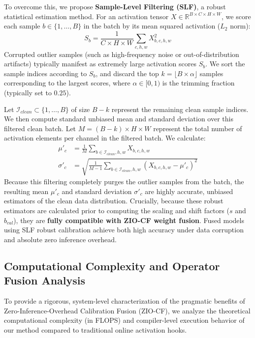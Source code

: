 \documentclass{article}
\begin{document}
To overcome this, we propose \textbf{Sample-Level Filtering (SLF)}, a robust statistical estimation method. For an activation tensor $X \in \mathbb{R}^{B \times C \times H \times W}$, we score each sample $b \in \{1, \dots, B\}$ in the batch by its mean squared activation ($L_2$ norm):
\begin{equation}
    S_b = \frac{1}{C \times H \times W} \sum_{c, h, w} X_{b, c, h, w}^2
\end{equation}
Corrupted outlier samples (such as high-frequency noise or out-of-distribution artifacts) typically manifest as extremely large activation scores $S_b$. We sort the sample indices according to $S_b$, and discard the top $k = \lfloor B \times \alpha \rfloor$ samples corresponding to the largest scores, where $\alpha \in [0, 1)$ is the trimming fraction (typically set to $0.25$). 

Let $\mathcal{I}_{clean} \subset \{1, \dots, B\}$ of size $B - k$ represent the remaining clean sample indices. We then compute standard unbiased mean and standard deviation over this filtered clean batch. Let $M = (B-k) \times H \times W$ represent the total number of activation elements per channel in the filtered batch. We calculate:
\begin{align}
    \mu'_c &= \frac{1}{M} \sum_{b \in \mathcal{I}_{clean}, h, w} X_{b, c, h, w} \\
    \sigma'_c &= \sqrt{\frac{1}{M - 1} \sum_{b \in \mathcal{I}_{clean}, h, w} \left(X_{b, c, h, w} - \mu'_c\right)^2}
\end{align}
Because this filtering completely purges the outlier samples from the batch, the resulting mean $\mu'_c$ and standard deviation $\sigma'_c$ are highly accurate, unbiased estimators of the clean data distribution. Crucially, because these robust estimators are calculated prior to computing the scaling and shift factors ($s$ and $b_{cal}$), they are \textbf{fully compatible with ZIO-CF weight fusion}. Fused models using SLF robust calibration achieve both high accuracy under data corruption and absolute zero inference overhead.

\subsection{Computational Complexity and Operator Fusion Analysis}
To provide a rigorous, system-level characterization of the pragmatic benefits of Zero-Inference-Overhead Calibration Fusion (ZIO-CF), we analyze the theoretical computational complexity (in FLOPS) and compiler-level execution behavior of our method compared to traditional online activation hooks.
\end{document}
